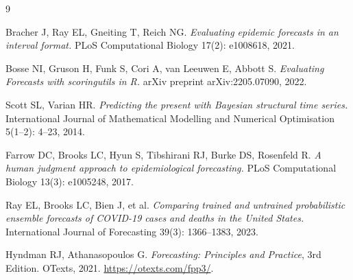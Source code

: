 \documentclass[11pt]{article}
\begin{document}
\newpage

\begin{thebibliography}{9}\small

Bracher J, Ray EL, Gneiting T, Reich NG.
\textit{Evaluating epidemic forecasts in an interval format.}
PLoS Computational Biology 17(2): e1008618, 2021.

Bosse NI, Gruson H, Funk S, Cori A, van Leeuwen E, Abbott S.
\textit{Evaluating Forecasts with scoringutils in R.}
arXiv preprint arXiv:2205.07090, 2022.

Scott SL, Varian HR.
\textit{Predicting the present with Bayesian structural time series.}
International Journal of Mathematical Modelling and Numerical
Optimisation 5(1--2): 4--23, 2014.

Farrow DC, Brooks LC, Hyun S, Tibshirani RJ, Burke DS, Rosenfeld R.
\textit{A human judgment approach to epidemiological forecasting.}
PLoS Computational Biology 13(3): e1005248, 2017.

Ray EL, Brooks LC, Bien J, et al.
\textit{Comparing trained and untrained probabilistic ensemble forecasts of COVID-19 cases and deaths in the United States.}
International Journal of Forecasting 39(3): 1366--1383, 2023.

Hyndman RJ, Athanasopoulos G.
\textit{Forecasting: Principles and Practice}, 3rd Edition.
OTexts, 2021. \url{https://otexts.com/fpp3/}.

\end{thebibliography}
\end{document}
